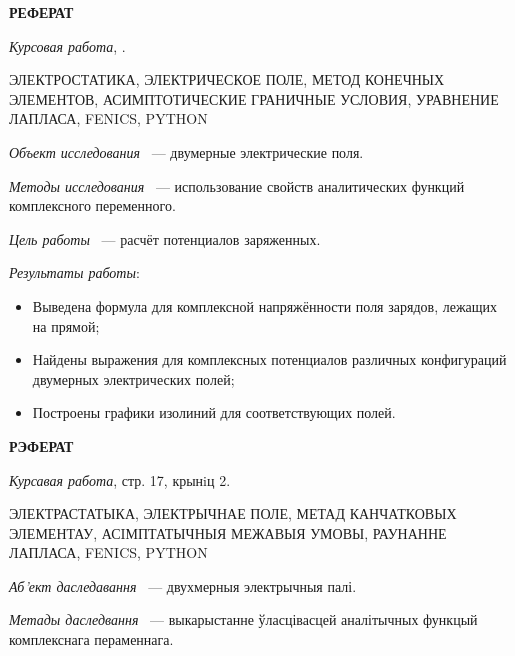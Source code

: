 \newpage
\centerline{\textbf{РЕФЕРАТ}}
\vspace{0.3cm}

\textit{Курсовая работа}, .

\vspace{0.1cm}

{ ЭЛЕКТРОСТАТИКА, ЭЛЕКТРИЧЕСКОЕ ПОЛЕ, МЕТОД КОНЕЧНЫХ ЭЛЕМЕНТОВ, АСИМПТОТИЧЕСКИЕ ГРАНИЧНЫЕ УСЛОВИЯ, УРАВНЕНИЕ ЛАПЛАСА, FENICS, PYTHON }

\vspace{0.1cm}

\textit{Объект исследования} ~--- двумерные электрические поля.

\vspace{0.1cm}

\textit{Методы исследования} ~--- использование свойств аналитических функций комплексного переменного.

\vspace{0.1cm}

\textit{Цель работы} ~--- расчёт потенциалов заряженных.

\vspace{0.1cm}

\textit{Результаты работы}:
\begin{itemize}
\item Выведена формула для комплексной напряжённости поля зарядов, лежащих на прямой;
\item Найдены выражения для комплексных потенциалов различных конфигураций двумерных электрических полей;
\item Построены графики изолиний для соответствующих полей.
\end{itemize}

\newpage

\centerline{\textbf{РЭФЕРАТ}}
\vspace{0.3cm}

\textit{Курсавая работа}, стр. 17, крынiц 2.

\vspace{0.1cm}

{ ЭЛЕКТРАСТАТЫКА, ЭЛЕКТРЫЧНАЕ ПОЛЕ, МЕТАД КАНЧАТКОВЫХ ЭЛЕМЕНТАУ, АСIМПТАТЫЧНЫЯ МЕЖАВЫЯ УМОВЫ, РАУНАННЕ ЛАПЛАСА, FENICS, PYTHON }

\vspace{0.1cm}

\textit{Аб'ект даследавання} ~--- двухмерныя электрычныя палі.

\vspace{0.1cm}

\textit{Метады даследвання} ~--- выкарыстанне ўласцівасцей аналітычных функцый комплекснага пераменнага.

